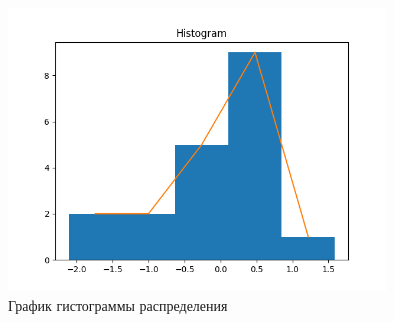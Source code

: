 \documentclass{article}
\begin{document}
\begin{figure}[h]
    \centering
    \includegraphics[width=10cm]{hist.png}
    \caption{График гистограммы распределения}
\end{figure}
\end{document}
